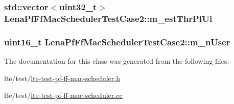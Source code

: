 \subsubsection[{\texorpdfstring{m\+\_\+est\+Thr\+Pf\+Ul}{m_estThrPfUl}}]{\setlength{\rightskip}{0pt plus 5cm}std\+::vector$<$uint32\+\_\+t$>$ Lena\+Pf\+Ff\+Mac\+Scheduler\+Test\+Case2\+::m\+\_\+est\+Thr\+Pf\+Ul\hspace{0.3cm}{\ttfamily [private]}}\hypertarget{classLenaPfFfMacSchedulerTestCase2_a46559fc558ba40a865de7f13f7aed13c}{}\label{classLenaPfFfMacSchedulerTestCase2_a46559fc558ba40a865de7f13f7aed13c}
\subsubsection[{\texorpdfstring{m\+\_\+n\+User}{m_nUser}}]{\setlength{\rightskip}{0pt plus 5cm}uint16\+\_\+t Lena\+Pf\+Ff\+Mac\+Scheduler\+Test\+Case2\+::m\+\_\+n\+User\hspace{0.3cm}{\ttfamily [private]}}\hypertarget{classLenaPfFfMacSchedulerTestCase2_a48ae704964f6973d4c7a957cb7d673da}{}\label{classLenaPfFfMacSchedulerTestCase2_a48ae704964f6973d4c7a957cb7d673da}


The documentation for this class was generated from the following files\+:\begin{DoxyCompactItemize}
\item 
lte/test/\hyperlink{lte-test-pf-ff-mac-scheduler_8h}{lte-\/test-\/pf-\/ff-\/mac-\/scheduler.\+h}\item 
lte/test/\hyperlink{lte-test-pf-ff-mac-scheduler_8cc}{lte-\/test-\/pf-\/ff-\/mac-\/scheduler.\+cc}\end{DoxyCompactItemize}
